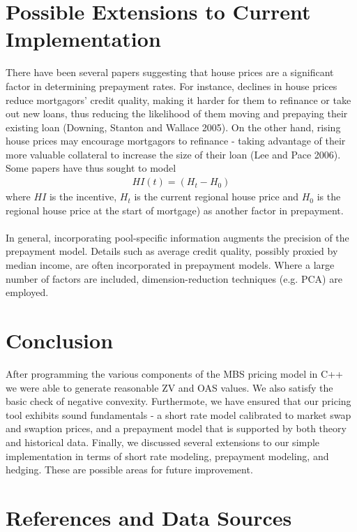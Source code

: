 \documentclass[10pt,letterpaper]{article}
\begin{document}
\section{Possible Extensions to Current Implementation}
There have been several papers suggesting that house prices are a significant factor in determining prepayment rates. For instance, declines in house prices reduce mortgagors' credit quality, making it harder for them to refinance or take out new loans, thus reducing the likelihood of them moving and prepaying their existing loan (Downing, Stanton and Wallace 2005). On the other hand, rising house prices may encourage mortgagors to refinance - taking advantage of their more valuable collateral to increase the size of their loan (Lee and Pace 2006). Some papers have thus sought to model
\begin{eqnarray}
HI(t) = (H_t - H_0)
\end{eqnarray}
where $HI$ is the incentive, $H_t$ is the current regional house price and $H_0$ is the regional house price at the start of mortgage) as another factor in prepayment.\\
\\
In general, incorporating pool-specific information augments the precision of the prepayment model. Details such as average credit quality, possibly proxied by median income, are often incorporated in prepayment models.  Where a large number of factors are included, dimension-reduction techniques (e.g. PCA) are employed.
\section{Conclusion}
After programming the various components of the MBS pricing model in C++ we were able to generate reasonable ZV and OAS values. We also satisfy the basic check of negative convexity. Furthermote, we have ensured that our pricing tool exhibits sound fundamentals - a short rate model calibrated to market swap and swaption prices, and a prepayment model that is supported by both theory and historical data. Finally, we discussed several extensions to our simple implementation in terms of short rate modeling, prepayment modeling, and hedging. These are possible areas for future improvement.
\newpage
\section*{References and Data Sources}
\end{document}
